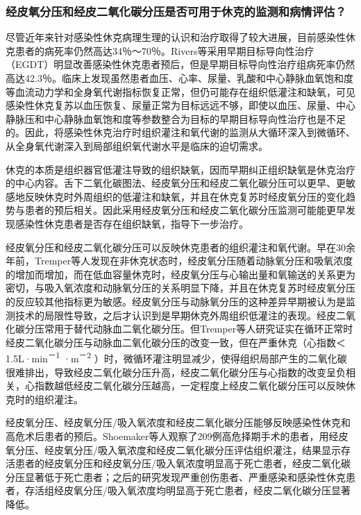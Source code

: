 \subsubsection{经皮氧分压和经皮二氧化碳分压是否可用于休克的监测和病情评估？}

尽管近年来针对感染性休克病理生理的认识和治疗取得了较大进展，目前感染性休克患者的病死率仍然高达34％～70％。Rivers等采用早期目标导向性治疗（EGDT）明显改善感染性休克患者预后，但是早期目标导向性治疗组病死率仍然高达42.3％。临床上发现虽然患者血压、心率、尿量、乳酸和中心静脉血氧饱和度等血流动力学和全身氧代谢指标恢复正常，但仍可能存在组织低灌注和缺氧，可见感染性休克复苏以血压恢复、尿量正常为目标远远不够，即使以血压、尿量、中心静脉压和中心静脉血氧饱和度等参数整合为目标的早期目标导向性治疗也是不足的。因此，将感染性休克治疗时组织灌注和氧代谢的监测从大循环深入到微循环、从全身氧代谢深入到局部组织氧代谢水平是临床的迫切需求。

休克的本质是组织器官低灌注导致的组织缺氧，因而早期纠正组织缺氧是休克治疗的中心内容。舌下二氧化碳图法、经皮氧分压和经皮二氧化碳分压可以更早、更敏感地反映休克时外周组织的低灌注和缺氧，并且在休克复苏时经皮氧分压的变化趋势与患者的预后相关。因此采用经皮氧分压和经皮二氧化碳分压监测可能能更早发现感染性休克患者是否存在组织缺氧，指导下一步治疗。

经皮氧分压和经皮二氧化碳分压可以反映休克患者的组织灌注和氧代谢。早在30余年前，Tremper等人发现在非休克状态时，经皮氧分压随着动脉氧分压和吸氧浓度的增加而增加，而在低血容量休克时，经皮氧分压与心输出量和氧输送的关系更为密切，与吸入氧浓度和动脉氧分压的关系明显下降，并且在休克复苏时经皮氧分压的反应较其他指标更为敏感。经皮氧分压与动脉氧分压的这种差异早期被认为是监测技术的局限性导致，之后才认识到是早期休克外周组织低灌注的表现。经皮二氧化碳分压常用于替代动脉血二氧化碳分压。但Tremper等人研究证实在循环正常时经皮二氧化碳分压与动脉血二氧化碳分压的改变一致，但在严重休克（心指数＜1.5L·min\textsuperscript{－1}
·m\textsuperscript{－2}
）时，微循环灌注明显减少，使得组织局部产生的二氧化碳很难排出，导致经皮二氧化碳分压升高，经皮二氧化碳分压与心指数的改变呈负相关，心指数越低经皮二氧化碳分压越高，一定程度上经皮二氧化碳分压可以反映休克时的组织灌注。

经皮氧分压、经皮氧分压/吸入氧浓度和经皮二氧化碳分压能够反映感染性休克和高危术后患者的预后。Shoemaker等人观察了209例高危择期手术的患者，用经皮氧分压、经皮氧分压/吸入氧浓度和经皮二氧化碳分压评估组织灌注，结果显示存活患者的经皮氧分压和经皮氧分压/吸入氧浓度明显高于死亡患者，经皮二氧化碳分压显著低于死亡患者；之后的研究发现严重创伤患者、严重感染和感染性休克患者，存活组经皮氧分压/吸入氧浓度均明显高于死亡患者，经皮二氧化碳分压显著降低。

